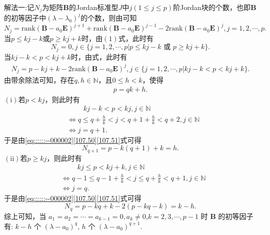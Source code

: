 \documentclass[../../main.tex]{subfiles}%
\begin{document}
\begin{solution}
{\color{blue}解法一:}记$N_j$为矩阵$\boldsymbol{B}$的Jordan标准型$J$中$j(1 \leqslant j \leqslant p)$阶Jordan块的个数，也即$\boldsymbol{B}$的初等因子中$(\lambda - \lambda_0)^j$的个数，则由可知
$$N_j = \mathrm{rank}(\boldsymbol{B} - a_0\boldsymbol{E})^{j+1} + \mathrm{rank}(\boldsymbol{B} - a_0\boldsymbol{E})^{j-1} - 2\mathrm{rank}(\boldsymbol{B} - a_0\boldsymbol{E})^j, j = 1,2,\cdots,p.$$
\one 当$p \leqslant kj - k$或$p \geqslant kj + k$时，由$(1)$式，此时有
$$N_j = 0, j \in \{j = 1,2,\cdots,p | p \leqslant kj - k \text{ 或 } p \geqslant kj + k\}.$$
\two 当$kj - k < p < kj + k$时，由式，此时有
\begin{align}
N_j = p - kj + k - 2\mathrm{rank}(\boldsymbol{B} - a_0\boldsymbol{E})^j, j \in \{j = 1,2,\cdots,p | kj - k < p < kj + k\}.\label{107.50}
\end{align}
由带余除法可知，存在$q,h \in \mathbb{N}$，且$0 \leqslant h < k$，使得
\begin{align}
p = qk + h.\label{107.51}
\end{align}
$\left( \mathrm{i} \right)$若$p < kj$，则此时有
\begin{align*}
&\quad \quad \,\, kj-k<p<kj,j\in \mathbb{N} 
\\
&\Longleftrightarrow q\leqslant q+\frac{h}{k}<j<q+1+\frac{h}{k}<q+2,j\in \mathbb{N} 
\\
&\Longleftrightarrow j=q+1.
\end{align*}
于是由\eqref{eq::::::--000002}\eqref{107.50}\eqref{107.51}式可得
$$N_{q+1} = p - k(q + 1) + k = h.$$
$\left( \mathrm{ii} \right)$若$p \geqslant kj$，则此时有
\begin{align*}
&\quad \quad \,\, kj\leqslant p<kj+k,j\in \mathbb{N} 
\\
&\Longleftrightarrow q-1\leqslant q-1+\frac{h}{k}<j\leqslant q+\frac{h}{k}<q+1,j\in \mathbb{N} 
\\
&\Longleftrightarrow j=q.
\end{align*}
于是由\eqref{eq::::::--000002}\eqref{107.50}\eqref{107.51}式可得
$$N_q = p - kq + k - 2(p - kq - k) = k - h.$$
综上可知，当 $a_1 = a_2 = \cdots = a_{k-1} = 0, a_k \neq 0$,$k=2,3,\cdots,p-1$ 时 $\boldsymbol{B}$ 的初等因子有: $k - h$ 个 $(\lambda - a_0)^q$, $h$ 个 $(\lambda - a_0)^{q+1}$.


\end{solution}
\end{document}
